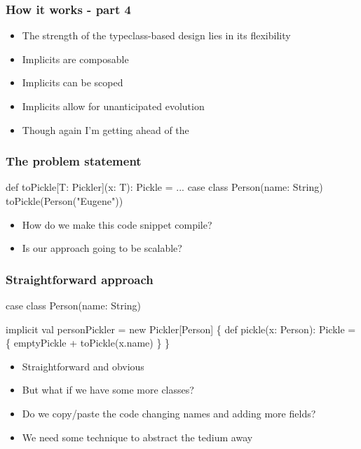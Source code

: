 \documentclass[svgnames,hyperref={bookmarks=false}]{beamer}
\begin{document}
\begin{frame}[fragile]
\frametitle{How it works - part 4}

\begin{itemize}
\item The strength of the typeclass-based design lies in its flexibility
\item Implicits are composable
\item Implicits can be scoped
\item Implicits allow for unanticipated evolution
\item Though again I'm getting ahead of the 
\end{itemize}
\end{frame}

\begin{frame}[fragile]
\frametitle{The problem statement}

\begin{semiverbatim}
def toPickle[T: Pickler](x: T): Pickle = ...
case class Person(name: String)
toPickle(Person("Eugene"))

\end{semiverbatim}

\begin{itemize}
\item How do we make this code snippet compile?
\item Is our approach going to be scalable?
\end{itemize}
\end{frame}

\begin{frame}[fragile]
\frametitle{}

\vskip40pt
\begin{center}
\end{center}
\end{frame}

\begin{frame}[fragile]
\frametitle{Straightforward approach}

\begin{semiverbatim}
case class Person(name: String)

implicit val personPickler = new Pickler[Person] \{
  def pickle(x: Person): Pickle = \{
    emptyPickle + toPickle(x.name)
  \}
\}

\end{semiverbatim}

\begin{itemize}
\item Straightforward and obvious
\item But what if we have some more classes?
\item Do we copy/paste the code changing names and adding more fields?
\item We need some technique to abstract the tedium away
\end{itemize}
\end{frame}
\end{document}
